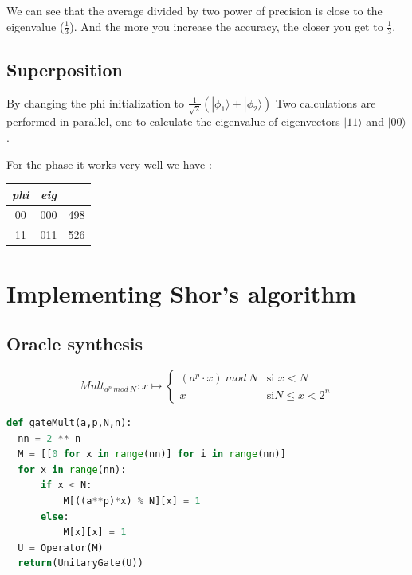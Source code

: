 \documentclass{article}
\theoremstyle{plain}
\begin{document}
      We can see that the average divided by two power of precision is close to
      the eigenvalue ($\frac 1 3$). And the more you increase the accuracy,
      the closer you get to $\frac 1 3$.
    \subsection{Superposition}

    By changing the phi initialization to $\frac1{\sqrt2}(|\phi_1\rangle + |\phi_2\rangle)$
    Two calculations are performed in parallel, one to calculate the eigenvalue
    of eigenvectors $|11\rangle$ and $|00\rangle$.

    For the phase it works very well we have :

    \begin{center}
      \begin{tabular}{c | c | l}
        \textit{phi} & \textit{eig} & \\
        \hline
        00 & 000 & 498 \\
        11 & 011 & 526 \\
      \end{tabular}
    \end{center}

  \section{Implementing Shor's algorithm}

    \subsection{Oracle synthesis}

    $$
      Mult_{a^p~mod~N} : x\mapsto 
      \left\{
      \begin{array}{ll}
      (a^p\cdot x)~mod~N & \text{si }x < N
      \\
      x & \text{si} N \leq x < 2^n
      \end{array}\right.
    $$


    \begin{lstlisting}[language=python]
def gateMult(a,p,N,n):
  nn = 2 ** n
  M = [[0 for x in range(nn)] for i in range(nn)]
  for x in range(nn):
      if x < N:
          M[((a**p)*x) % N][x] = 1
      else:
          M[x][x] = 1
  U = Operator(M)
  return(UnitaryGate(U))
    \end{lstlisting}
\end{document}
